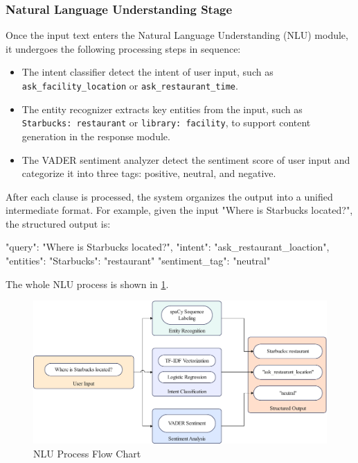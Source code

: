 \documentclass{xum_review}
\begin{document}
	\subsubsection{Natural Language Understanding Stage}

	Once the input text enters the Natural Language Understanding (NLU) module,
	it undergoes the following processing steps in sequence:
	\begin{itemize}
		\item	The intent classifier detect the intent of user input, such as
	 \texttt{ask\_facility\_location} or \texttt{ask\_restaurant\_time}.
		\item	The entity recognizer extracts key entities from the input, such
		as \texttt{Starbucks: restaurant} or \texttt{library: facility}, to
		support content generation in the response module.
		\item	The VADER sentiment analyzer detect the sentiment score of user input
		and categorize it into three tags: positive, neutral, and negative.
	\end{itemize}

	After each clause is processed, the system organizes the output into a
	unified intermediate format. For example, given the input "Where is
	Starbucks located?", the structured output is:

	\begin{json}
	{ 
		"query": "Where is Starbucks located?",
		"intent": "ask_restaurant_loaction",
		"entities": {"Starbucks": "restaurant"}
		"sentiment_tag": "neutral"
	}
	\end{json}

	The whole NLU process is shown in \cref{fig:nlu_process}.

	\begin{figure}[H]
		\centering
		\includegraphics[width=1\textwidth]{figure/nlu_flow.pdf}
		\caption{NLU Process Flow Chart}
		\label{fig:nlu_process}
	\end{figure}
\end{document}
